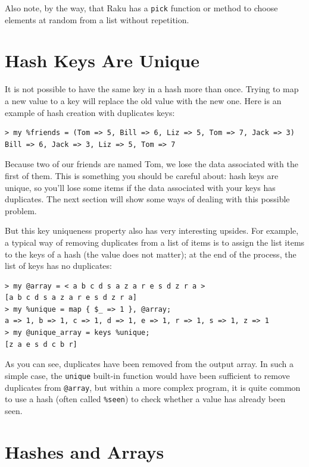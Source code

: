 Also note, by the way, that Raku has a {\tt pick} function or 
method to choose elements at random from a list without 
repetition.


\section{Hash Keys Are Unique}

It is not possible to have the same key in a hash more than once. 
Trying to map a new value to a key will replace the old 
value with the new one. Here is an example of hash creation 
with duplicates keys:

\begin{verbatim}
> my %friends = (Tom => 5, Bill => 6, Liz => 5, Tom => 7, Jack => 3)
Bill => 6, Jack => 3, Liz => 5, Tom => 7
\end{verbatim}

Because two of our friends are named Tom, we lose the data 
associated with the first of them. This is something you should 
be careful about: hash keys are unique, so you'll lose some items  
if the data associated with your keys has duplicates. The 
next section will show some ways of dealing with this 
possible problem.

But this key uniqueness property also has very interesting upsides. 
For example, a typical way of removing duplicates from a list of 
items is to assign the list items to the keys of a hash (the 
value does not matter); at the end of the process, the list of 
keys has no duplicates:

\begin{verbatim}
> my @array = < a b c d s a z a r e s d z r a >
[a b c d s a z a r e s d z r a]
> my %unique = map { $_ => 1 }, @array;
a => 1, b => 1, c => 1, d => 1, e => 1, r => 1, s => 1, z => 1
> my @unique_array = keys %unique;
[z a e s d c b r]
\end{verbatim}

As you can see, duplicates have been removed from the output 
array. In such a simple case, the {\tt unique} built-in function 
would have been sufficient to remove duplicates from 
\verb'@array', but within a more complex program, 
it is quite common to use a hash (often called \verb'%seen') 
to check whether a value has already been seen.

\section{Hashes and Arrays}
\label{invert}


